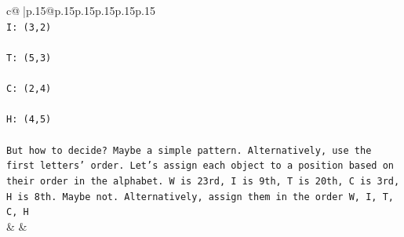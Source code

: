 \documentclass{article}
\begin{document}
{\begin{supertabular}{c@{$\;$}|p{.15\linewidth}@{}p{.15\linewidth}p{.15\linewidth}p{.15\linewidth}p{.15\linewidth}p{.15\linewidth}}
{{{\\ 
\texttt{I: (3,2)} \\
\\ 
\texttt{T: (5,3)} \\
\\ 
\texttt{C: (2,4)} \\
\\ 
\texttt{H: (4,5)} \\
\\ 
\texttt{But how to decide? Maybe a simple pattern. Alternatively, use the first letters' order. Let's assign each object to a position based on their order in the alphabet. W is 23rd, I is 9th, T is 20th, C is 3rd, H is 8th. Maybe not. Alternatively, assign them in the order W, I, T, C, H} \\
            }
        }
    }
    & & \\ \\


\end{supertabular}}
\end{document}
